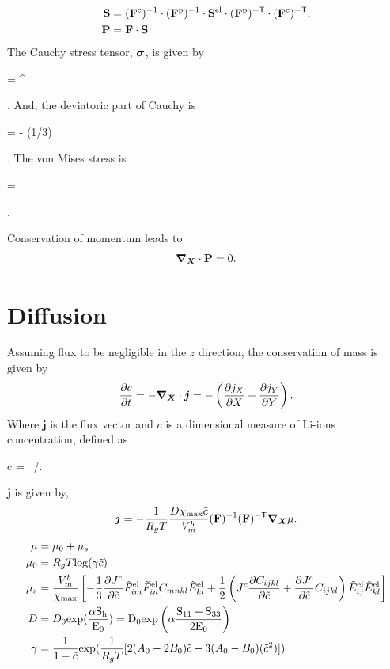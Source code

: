 \begin{align}
    \mathbf{S} &= (\mathbf{F}^{\rm{c}})^{-1} \cdot  (\mathbf{F}^{\rm{p}})^{-1} \cdot \mathbf{S}^{\rm{el}} \cdot  (\mathbf{F}^{\rm{p}})^{{-\sf {T}}} \cdot (\mathbf{F}^{\rm{c}})^{{-\sf {T}}}, \label{eq:S_tensor}\\
    \mathbf{P} &= \mathbf{F} \cdot  \mathbf{S}  \label{eq:P_tensor}
\end{align}
The Cauchy stress tensor, $\bm{\sigma}$, is given by 
\begin{nonumbereq}\CS =  \PK \cdot  \F^\T\
\end{nonumbereq}. And, the deviatoric part of Cauchy is \begin{nonumbereq}\DCS = \CS - (1/3)\tr{\CS}\I
\end{nonumbereq}.
The von Mises stress is 
\begin{nonumbereq}
    \sigmaeff =  
\end{nonumbereq}.

Conservation of momentum leads to 
\begin{gather}
\bm{\nabla}_{\bm{X}} \cdot \mathbf{P} = 0.
\end{gather}

\section{Diffusion}
Assuming flux to be negligible in the $z$ direction, the conservation of mass is given by
\begin{gather}
    \frac{\partial c}{\partial t} = - \bm{\nabla}_{\bm{X}} \cdot \bm{j} = -\left(\frac{\partial j_X}{\partial X} + \frac{\partial j_Y}{\partial Y}\right).
\end{gather}
Where $\bm{j}$ is the flux vector and $c$ is a dimensional measure of Li-ions concentration, defined as 
\begin{nonumbereq}
    c = \tc \, \xmax/\vmb.
\end{nonumbereq}
$\bm{j}$ is given by, 
\begin{gather}
    \bm{j} = - \frac{1}{R_g T} \frac{D\chi_{{\rm{max}}} \tilde{c}}{V^b_m} (\mathbf{F})^{-1} (\mathbf{F})^{{-\sf {T}}} \bm{\nabla}_{\bm{X}} \mu.
\end{gather}
\begin{align}
    \mu &= \mu_0 + \mu_s \\
    \mu_0 &= R_g T \text{log}(\gamma \tilde{c}) \\
    \mu_s &= \frac{V_m^b}{\chi_{{\rm{max}}}}\left[-\frac{1}{3}\frac{\partial {J^c}}{\partial \tilde{c}}\tilde{F}_{im}^{{\rm{el}}}\tilde{F}_{in}^{{\rm{el}}}{C}_{mnkl}\tilde{E}_{kl}^{{\rm{el}}} + \frac{1}{2}\left({J^c} \frac{\partial C_{ijkl}}{\partial \tilde{c}} + \frac{\partial {J^c}}{\partial \tilde{c}} C_{ijkl}\right)\tilde{E}_{ij}^{{\rm{el}}}\tilde{E}_{kl}^{{\rm{el}}}\right] \\
    D &= D_0 \rm{exp}(\frac{\alpha S_h}{E_0}) = D_0 \rm{exp}\left(\alpha \frac{{S}_{11}+{S}_{33}}{2 E_0}\right) \\ 
    \gamma &= \frac{1}{1-\tilde{c}}\text{exp}(\frac{1}{R_g T}[2(A_0 - 2B_0)\tilde{c} - 3(A_0 - B_0)(\tilde{c}^2)])
\end{align}

